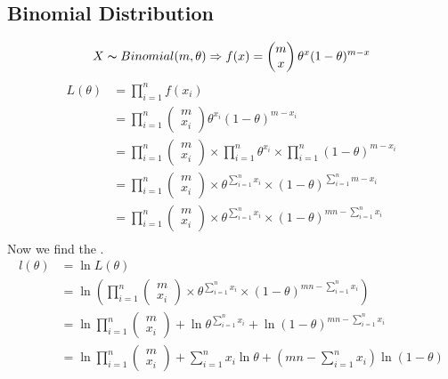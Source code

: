 \documentclass{report}
\begin{document}
\subsection*{Binomial Distribution}
\[X \thicksim Binomial(m, \theta) \Rightarrow f(x) =\begin{pmatrix}
		m \\ x
	\end{pmatrix}\theta^x(1 - \theta)^{m-x}\]
\[\begin{split}
		L(\theta) &= \prod_{i=1}^n f(x_i) \\
		&= \prod_{i=1}^n \begin{pmatrix}
			m \\ x_i
		\end{pmatrix}\theta^{x_i}(1 - \theta)^{m-x_i} \\
		&= \prod_{i=1}^n \begin{pmatrix}
			m \\ x_i
		\end{pmatrix} \times \prod_{i=1}^n\theta^{x_i} \times \prod_{i=1}^n(1 - \theta)^{m-x_i} \\
		&= \prod_{i=1}^n \begin{pmatrix}
			m \\ x_i
		\end{pmatrix} \times \theta^{\sum_{i=1}^nx_i} \times (1 - \theta)^{\sum_{i=1}^n m - x_i} \\
		&= \prod_{i=1}^n \begin{pmatrix}
			m \\ x_i
		\end{pmatrix} \times \theta^{\sum_{i=1}^nx_i} \times (1 - \theta)^{mn - \sum_{i=1}^n x_i} \\
	\end{split}\]
Now we find the .
\[\begin{split}
		l(\theta) &= \ln L(\theta) \\
		&= \ln \left( \prod_{i=1}^n \begin{pmatrix}
			m \\ x_i
		\end{pmatrix} \times \theta^{\sum_{i=1}^nx_i} \times (1 - \theta)^{mn - \sum_{i=1}^n x_i} \right) \\
		&= \ln \prod_{i=1}^n \begin{pmatrix}
			m \\ x_i
		\end{pmatrix} + \ln \theta^{\sum_{i=1}^nx_i} + \ln (1 - \theta)^{mn - \sum_{i=1}^n x_i} \\
		&= \ln \prod_{i=1}^n \begin{pmatrix}
			m \\ x_i
		\end{pmatrix} + \sum_{i=1}^nx_i\ln \theta + \left( mn - \sum_{i=1}^n x_i \right)\ln (1 - \theta) \\
	\end{split}\]
\end{document}
